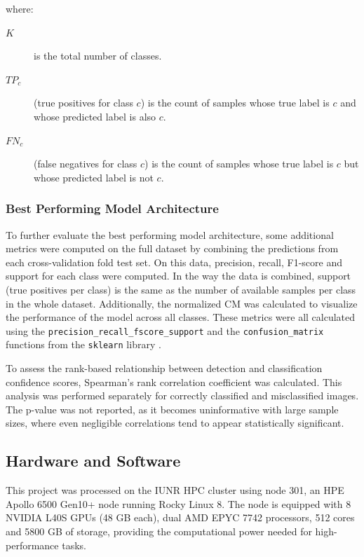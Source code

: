     \noindent where:
    \begin{description}
        \item[\(K\)] is the total number of classes.
        \item[\(TP_{c}\)] (true positives for class \(c\)) is the count of samples whose true label is \(c\) and whose predicted label is also \(c\).
        \item[\(FN_{c}\)] (false negatives for class \(c\)) is the count of samples whose true label is \(c\) but whose predicted label is not \(c\).
    \end{description}

    \subsubsection{Best Performing Model Architecture}
    To further evaluate the best performing model architecture, some additional metrics were computed on the full dataset by combining the predictions from each cross-validation fold test set.
    On this data, precision, recall, F1-score and support for each class were computed.
    In the way the data is combined, support (true positives per class) is the same as the number of available samples per class in the whole dataset.
    Additionally, the normalized \ac{CM} was calculated to visualize the performance of the model across all classes.
    These metrics were all calculated using the \texttt{precision\_recall\_fscore\_support} and the \texttt{confusion\_matrix} functions from the \texttt{sklearn} library \autocite{pedregosaScikitlearnMachineLearning2011}.

    To assess the rank-based relationship between detection and classification confidence scores, Spearman's rank correlation coefficient was calculated.
    This analysis was performed separately for correctly classified and misclassified images.
    The p-value was not reported, as it becomes uninformative with large sample sizes, where even negligible correlations tend to appear statistically significant.

    \subsection{Hardware and Software}
    This project was processed on the \ac{IUNR} \ac{HPC} cluster using node 301, an HPE Apollo 6500 Gen10+ node running Rocky Linux 8.
    The node is equipped with 8 NVIDIA L40S \acp{GPU} (48 \ac{GB} each), dual AMD EPYC 7742 processors, 512 cores and 5800 \ac{GB} of storage, providing the computational power needed for high-performance tasks.


